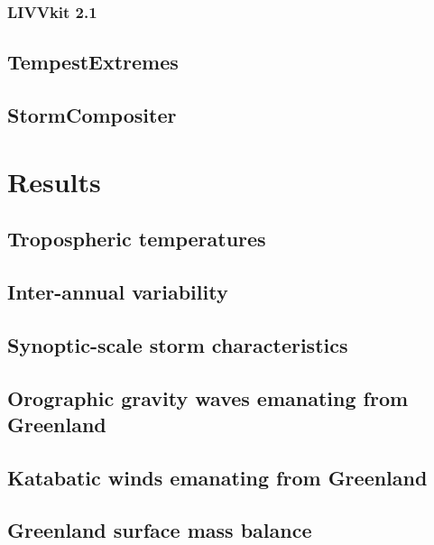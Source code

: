 \documentclass[draft]{agujournal2019}
\begin{document}
\subsubsection{LIVVkit 2.1}
\subsection{TempestExtremes}
\subsection{StormCompositer}

\section{Results}\label{sec:results}

\subsection{Tropospheric temperatures}
\subsection{Inter-annual variability}
\subsection{Synoptic-scale storm characteristics}
\subsection{Orographic gravity waves emanating from Greenland}
\subsection{Katabatic winds emanating from Greenland}
\subsection{Greenland surface mass balance}

%
%
%
%
\end{document}
